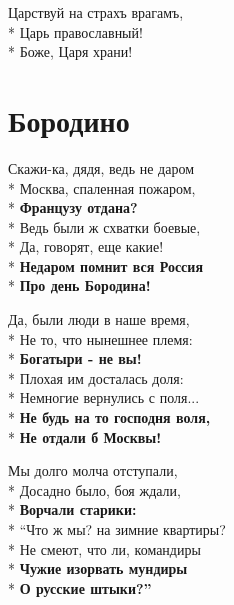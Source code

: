 \begin{minipage}{\linewidth}
Царствуй на страхъ врагамъ,\\*
Царь православный!\\*
Боже, Царя храни!\\
\end{minipage}

\vspace{\fill}\newpage

\section{Бородино}
\label{song:Бородино}

\medskip

\begin{minipage}{\linewidth}
Скажи-ка, дядя, ведь не даром\\*
Москва, спаленная пожаром,\\*
\textbf{Французу отдана?}\\*
Ведь были ж схватки боевые,\\*
Да, говорят, еще какие!\\*
\textbf{Недаром помнит вся Россия}\\*
\textbf{Про день Бородина!}\\
\end{minipage}\par\medskip\nobreak

\medskip

\begin{minipage}{\linewidth}
Да, были люди в наше время,\\*
Не то, что нынешнее племя:\\*
\textbf{Богатыри - не вы!}\\*
Плохая им досталась доля:\\*
Немногие вернулись с поля...\\*
\textbf{Не будь на то господня воля,}\\*
\textbf{Не отдали б Москвы!}\\
\end{minipage}\par\medskip\nobreak

\medskip

\begin{minipage}{\linewidth}
Мы долго молча отступали,\\*
Досадно было, боя ждали,\\*
\textbf{Ворчали старики:}\\*
“Что ж мы? на зимние квартиры?\\*
Не смеют, что ли, командиры\\*
\textbf{Чужие изорвать мундиры}\\*
\textbf{О русские штыки?”}\\
\end{minipage}\par\medskip\nobreak

